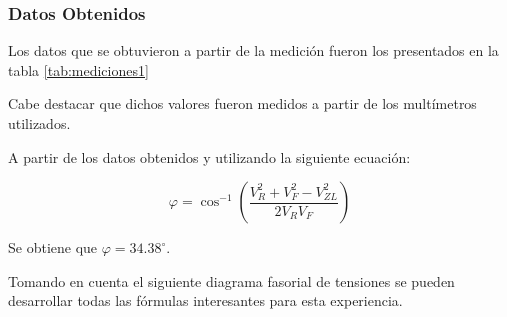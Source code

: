 \subsubsection{Datos Obtenidos}

Los datos que se obtuvieron a partir de la medición fueron los presentados en la tabla \ref{tab:mediciones1}

\begin{table}[H]
  \centering
  \renewcommand{\arraystretch}{1.4}
  \setlength{\arrayrulewidth}{0.5pt}
  \caption{Mediciones experiencia 1}
  \label{tab:mediciones1}
\end{table}
Cabe destacar que dichos valores fueron medidos a partir de los multímetros utilizados. 

A partir de los datos obtenidos y utilizando la siguiente ecuación:

\begin{equation*}
    \varphi = \cos^{-1}\!\left(\frac{V_R^2 + V_F^2 - V_{ZL}^2}{2V_R V_F}\right)
\end{equation*}

Se obtiene que $\varphi=34.38^{\circ}$.

Tomando en cuenta el siguiente diagrama fasorial de tensiones se pueden desarrollar todas las fórmulas interesantes para esta experiencia.

